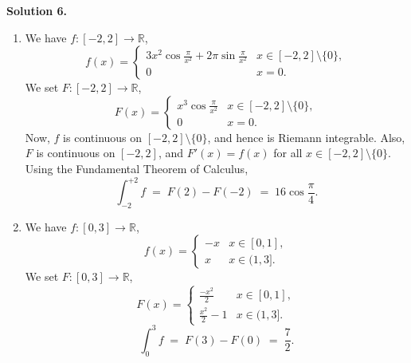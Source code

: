 \documentclass[10pt]{article}
\begin{document}
        \textbf{Solution 6.}
        \begin{enumerate}
                \item We have $f\colon [-2, 2] \to \mathbb{R}$,
                \[
                        f(x) =
                        \begin{cases}
                                3x^2\cos{\displaystyle\frac{\pi}{x^2}} + 2\pi\sin{\displaystyle\frac{\pi}{x^2}}   &       x \in [-2, 2]\setminus\{0\}, \\
                                0       &       x = 0.
                        \end{cases}
                \]
                We set $F\colon [-2, 2] \to \mathbb{R}$,
                \[
                        F(x) =
                        \begin{cases}
                                x^3\cos{\displaystyle\frac{\pi}{x^2}}   &       x \in [-2, 2]\setminus\{0\}, \\
                                0       &       x = 0.
                        \end{cases}
                \]
                Now, $f$ is continuous on $[-2, 2]\setminus\{0\}$, and hence is Riemann integrable. Also, $F$ is continuous on $[-2, 2]$, and
                $F'(x) = f(x)$ for all $x \in [-2, 2]\setminus\{0\}$. Using the Fundamental Theorem of Calculus,
                \[\int_{-2}^{+2} f \;=\; F(2) - F(-2) \;=\; 16 \cos{\frac{\pi}{4}}.\]

                \item We have $f\colon [0, 3] \to \mathbb{R}$,
                \[
                        f(x) =
                        \begin{cases}
                                -x      &       x \in [0, 1], \\
                                x       &       x \in (1, 3].
                        \end{cases}
                \]
                We set $F\colon [0, 3] \to \mathbb{R}$,
                \[
                        F(x) =
                        \begin{cases}
                                \frac{-x^2}{2}          &       x \in [0, 1], \\
                                \frac{x^2}{2} - 1       &      x \in (1, 3].
                        \end{cases}
                \]
                \[\int_{0}^{3} f \;=\; F(3) - F(0) \;=\; \frac{7}{2}.\]
                

\end{enumerate}
\end{document}

